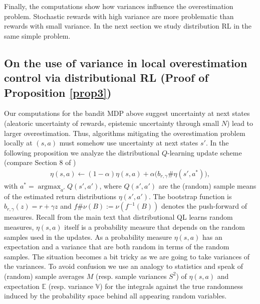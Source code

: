 \documentclass{article}
\newcommand{\E}{\mathbb{E}}
\theoremstyle{plain}
\theoremstyle{definition}
\theoremstyle{remark}
\begin{document}
Finally, the computations show how variances influence the overestimation problem. Stochastic rewards with high variance are more problematic than rewards with small variance. In the next section we study distribution RL in the same simple problem.

\subsection{On the use of variance in local overestimation control via distributional RL (Proof of Proposition \ref{prop3})}
Our computations for the bandit MDP above suggest uncertainty at next states (aleatoric uncertainty of rewards, epistemic uncertainty through small $N$) lead to larger overestimation. Thus, algorithms mitigating the overestimation problem locally at $(s,a)$ must somehow use uncertainty at next states $s'$. In the following proposition we analyze the distributional $Q$-learning update scheme (compare Section 8 of \cite{rowland18})
\begin{align*}
    \eta(s,a)\leftarrow (1-\alpha) \eta(s,a)+\alpha\big(b_{r,\gamma}\#\eta(s',a^*)\big),
\end{align*}
with $a^*=\operatorname{argmax}_{a'}Q(s',a')$, where $Q(s',a')$ are the (random) sample means of the estimated return distributions $\eta(s',a')$. The bootstrap function is $b_{r,\gamma}(z)= r+\gamma z$ and $f\#\nu(B):=\nu(f^{-1}(B))$ denotes the push-forward of measures. Recall from the main text that distributional QL learns random measures, $\eta(s,a)$ itself is a probability measure that depends on the random samples used in the updates. As a probability measure $\eta(s,a)$ has an expectation and a variance that are both random in terms of the random samples. The situation becomes a bit tricky as we are going to take variances of the variances. To avoid confusion we use an analogy to statistics and speak of (random) sample averages $M$ (resp. sample variances $S^2$) of $\eta(s,a)$ and expectation $\E$ (resp. variance $\mathbb V$) for the integrals against the true randomness induced by the probability space behind all appearing random variables.
\end{document}
